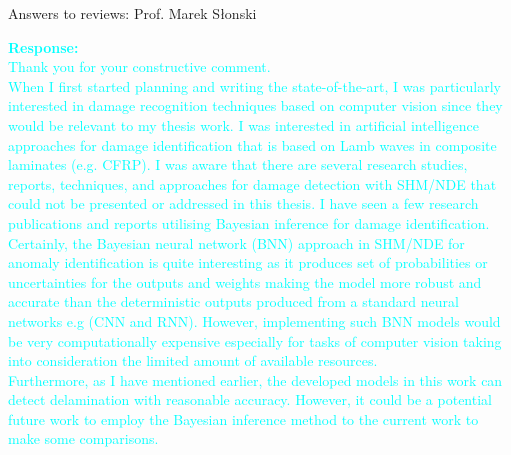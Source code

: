 \documentclass[10pt,aspectratio=169,dvipsnames]{beamer} %
\begin{document}
\begin{frame}{Answers to reviews: Prof. Marek S\l{}o{n}ski}
\begin{itemize}
{			\textcolor{Cyan}{
				\textbf{Response:} \\
				Thank you for your constructive comment. \\
				When I first started planning and writing the state-of-the-art, I was particularly interested in damage recognition techniques based on computer vision since they would be relevant to my thesis work.
				I was interested in artificial intelligence approaches for damage identification that is based on Lamb waves in composite laminates (e.g. CFRP).
				I was aware that there are several research studies, reports, techniques, and approaches for damage detection with SHM/NDE that could not be presented or addressed in this thesis.
				I have seen a few research publications and reports utilising Bayesian inference for damage identification.
				Certainly, the Bayesian neural network (BNN) approach in SHM/NDE for anomaly identification is quite interesting as it produces set of probabilities or uncertainties for the outputs and weights making the model more robust and accurate than the deterministic outputs produced from a standard neural networks e.g (CNN and RNN).
				However, implementing such BNN models would be very computationally expensive especially for tasks of computer vision taking into consideration the limited amount of available resources.
				\\
				Furthermore, as I have mentioned earlier, the developed models in this work can detect delamination with reasonable accuracy.
				However, it could be a potential future work to employ the Bayesian inference method to the current work to make some comparisons.}}
		\end{itemize}
	\end{frame}
\end{document}
